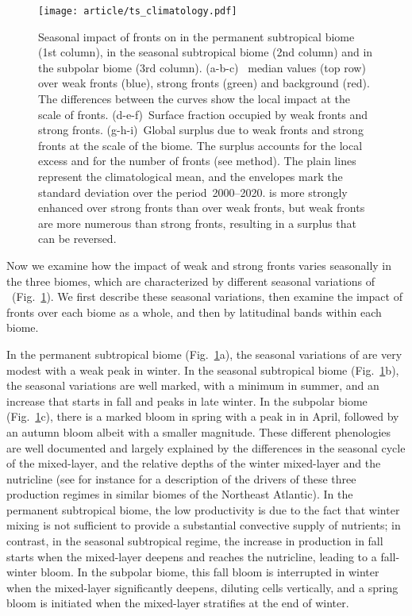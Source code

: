 \begin{figure}
  \centering
  \texttt{[image: article/ts\_climatology.pdf]}
  \caption[Seasonal impact of fronts on ]{
    Seasonal impact of fronts on  in the permanent subtropical biome (1st column), in the seasonal subtropical biome (2nd column) and in the subpolar biome (3rd column).
    (a-b-c)~ median values (top row) over weak fronts (blue), strong fronts (green) and background (red).
    The differences between the curves show the local impact at the scale of fronts.
    (d-e-f)~Surface fraction occupied by weak fronts and strong fronts.
    (g-h-i)~Global  surplus due to weak fronts and strong fronts at the scale of the biome.
    The surplus accounts for the local excess and for the number of fronts (see method).
    The plain lines represent the climatological mean, and the envelopes mark the standard deviation over the period~2000--2020.
     is more strongly enhanced over strong fronts than over weak fronts, but weak fronts are more numerous than strong fronts, resulting in a  surplus that can be reversed.
  }%
  \label{fig:ts-climato}
\end{figure}

Now we examine how the impact of weak and strong fronts varies seasonally in the three biomes, which are characterized by different seasonal variations of ~(Fig.~\ref{fig:ts-climato}).
We first describe these seasonal variations, then examine the impact of fronts over each biome as a whole, and then by latitudinal bands within each biome.

In the permanent subtropical biome (Fig.~\ref{fig:ts-climato}a), the seasonal variations of  are very modest with a weak peak in winter.
In the seasonal subtropical biome (Fig.~\ref{fig:ts-climato}b), the seasonal variations are well marked, with a minimum in summer, and an increase that starts in fall and peaks in late winter.
In the subpolar biome (Fig.~\ref{fig:ts-climato}c), there is a marked bloom in spring with a peak in  in April, followed by an autumn bloom albeit with a smaller magnitude.
These different phenologies are well documented and largely explained by the differences in the seasonal cycle of the mixed-layer, and the relative depths of the winter mixed-layer and the nutricline (see for instance \textcite{levy_2005a} for a description of the drivers of these three production regimes in similar biomes of the Northeast Atlantic).
In the permanent subtropical biome, the low productivity is due to the fact that winter mixing is not sufficient to provide a substantial convective supply of nutrients; in contrast, in the seasonal subtropical regime, the increase in production in fall starts when the mixed-layer deepens and reaches the nutricline, leading to a fall-winter bloom.
In the subpolar biome, this fall bloom is interrupted in winter when the mixed-layer significantly deepens, diluting cells vertically, and a spring bloom is initiated when the mixed-layer stratifies at the end of winter.

